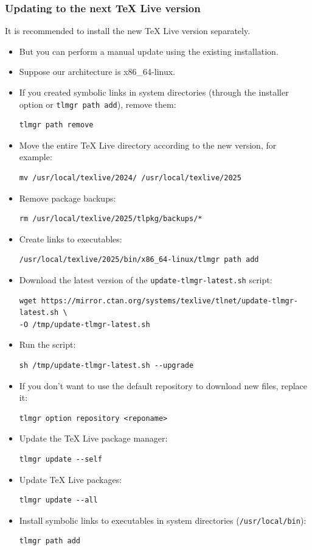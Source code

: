 \documentclass{article}
\begin{document}
\subsubsection{Updating to the next TeX Live version}
It is recommended to install the new TeX Live version separately.
\begin{itemize}
\item But you can perform a manual update using the existing installation.
\item Suppose our architecture is x86\_64-linux.
\item If you created symbolic links in system directories (through the installer option or \texttt{tlmgr path add}), remove them:
\begin{verbatim}
tlmgr path remove
\end{verbatim}
\item Move the entire TeX Live directory according to the new version, for example:
\begin{verbatim}
mv /usr/local/texlive/2024/ /usr/local/texlive/2025
\end{verbatim}
\item Remove package backups:
\begin{verbatim}
rm /usr/local/texlive/2025/tlpkg/backups/*
\end{verbatim}
\item Create links to executables:
\begin{verbatim}
/usr/local/texlive/2025/bin/x86_64-linux/tlmgr path add
\end{verbatim}
\item Download the latest version of the \texttt{update-tlmgr-latest.sh} script:
\begin{verbatim}
wget https://mirror.ctan.org/systems/texlive/tlnet/update-tlmgr-latest.sh \
-O /tmp/update-tlmgr-latest.sh
\end{verbatim}
\item Run the script:
\begin{verbatim}
sh /tmp/update-tlmgr-latest.sh --upgrade
\end{verbatim}
\item If you don't want to use the default repository to download new files, replace it:
\begin{verbatim}
tlmgr option repository <reponame>
\end{verbatim}
\item Update the TeX Live package manager:
\begin{verbatim}
tlmgr update --self
\end{verbatim}
\item Update TeX Live packages:
\begin{verbatim}
tlmgr update --all
\end{verbatim}
\item Install symbolic links to executables in system directories (\texttt{/usr/local/bin}):
\begin{verbatim}
tlmgr path add
\end{verbatim}
\end{itemize}
\end{document}
